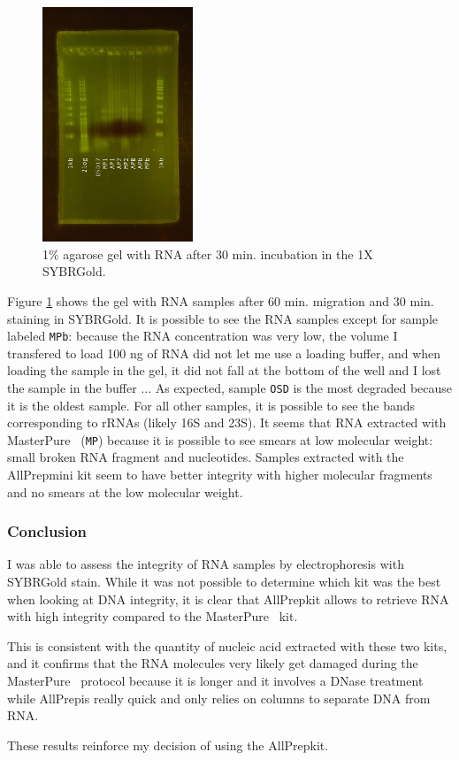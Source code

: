 \begin{figure}[H] %
    \centering
    \caption{1\% agarose gel with RNA after 30 min. incubation in the 1X SYBR\cR Gold.}
    \label{fig:20180317_gel_sybr_gold_rna}
    \includegraphics[width=0.4\textwidth]{graphics/pic/20180317_gel_sybr_gold_rna.jpg}
\end{figure}

Figure \ref{fig:20180317_gel_sybr_gold_rna} shows the gel with RNA samples after 60 min. migration and 30 min. staining in SYBR\cR Gold. It is possible to see the RNA samples except for sample labeled \texttt{MPb}: because the RNA concentration was very low, the volume I transfered to load 100 ng of RNA did not let me use a loading buffer, and when loading the sample in the gel, it did not fall at the bottom of the well and I lost the sample in the buffer ... 
As expected, sample \texttt{OSD} is the most degraded because it is the oldest sample. For all other samples, it is possible to see the bands corresponding to rRNAs (likely 16S and 23S). It seems that RNA extracted with MasterPure\texttrademark~ (\texttt{MP}) because it is possible to see smears at low molecular weight: small broken RNA fragment and nucleotides. 
Samples extracted with the AllPrep\cR mini kit seem to have better integrity with higher molecular fragments and no smears at the low molecular weight. 

\subsubsection{Conclusion}

I was able to assess the integrity of RNA samples by electrophoresis with SYBR\cR Gold stain. While it was not possible to determine which kit was the best when looking at DNA integrity, it is clear that AllPrep\cR kit allows to retrieve RNA with high integrity compared to the MasterPure\texttrademark~ kit. 

This is consistent with the quantity of nucleic acid extracted with these two kits, and it confirms that the RNA molecules very likely get damaged during the MasterPure\texttrademark~ protocol because it is longer and it involves a DNase treatment while AllPrep\cR is really quick and only relies on columns to separate DNA from RNA. 

These results reinforce my decision of using the AllPrep\cR kit.

